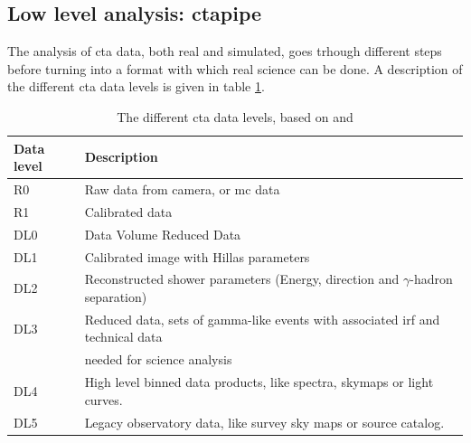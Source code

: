 \documentclass[main.tex]{subfiles}
\begin{document}
\subsection{Low level analysis: ctapipe}

The analysis of \gls{cta} data, both real and simulated, goes trhough different steps before turning into a format with which real science can be done. A description of the different \gls{cta} data levels is given in table \ref{tab:CTAdatalevels}. 


\begin{table}
  \centering
  \begin{tabular}{|l|l|}
    \hline
    Data level & Description \\
    \hline
    R0 & Raw data from camera, or \gls{mc} data\\
    R1 & Calibrated data \\
    DL0 & Data Volume Reduced Data \\
    DL1 & Calibrated image with Hillas parameters \\
    DL2 & Reconstructed shower parameters (Energy, direction and $\gamma$-hadron separation) \\
    DL3 & Reduced data, sets of gamma-like events with associated \gls{irf} and technical data\\
    & needed for science analysis \\
    DL4 & High level binned data products, like spectra, skymaps or light curves.\\
    DL5 & Legacy observatory data, like survey sky maps or source catalog. \\
    \hline
  \end{tabular}
  \caption{The different \gls{cta} data levels, based on \cite{ctapipe} and \cite{2015CTAdata}}
  \label{tab:CTAdatalevels}
\end{table}
\end{document}
